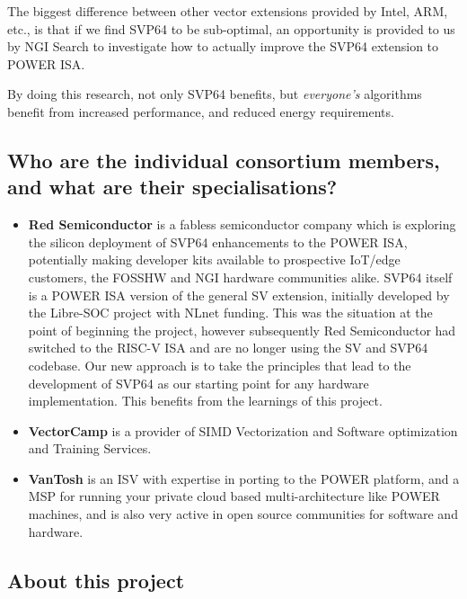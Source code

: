 The biggest difference between other vector extensions provided by Intel,
ARM, etc., is that if we find \acrshort{SVP64} to be sub-optimal, an opportunity is
provided to us by \acrshort{NGI} Search to investigate how to actually improve the
\acrshort{SVP64} extension to \acrshort{POWER} ISA.

By doing this research, not only \acrshort{SVP64} benefits, but \textit{everyone's} algorithms
benefit from increased performance, and reduced energy requirements.

\subsection{Who are the individual consortium members, and what are their specialisations?}

\begin{itemize}
  \item \textbf{Red Semiconductor} is a fabless semiconductor company which is
  exploring the silicon deployment of  \acrshort{SVP64} enhancements to the
  \acrshort{POWER} \acrshort{ISA}, potentially making developer kits available
  to prospective \acrfull{IoT}/edge customers, the \acrfull{FOSSHW} and
  \acrshort{NGI} hardware communities alike. \acrshort{SVP64} itself is a
  \acrshort{POWER} ISA version of the general \acrfull{SV} extension, initially
  developed by the Libre-SOC project with NLnet funding. This was the situation
  at the point of beginning the project, however subsequently Red Semiconductor
  had switched to the RISC-V \acrshort{ISA} and are no longer using the
  \acrshort{SV} and \acrshort{SVP64} codebase.
  Our new approach is to take the principles that lead to the development of
  \acrshort{SVP64} as our starting point for any hardware implementation.
  This benefits from the learnings of this project.
  \item \textbf{VectorCamp} is a provider of \acrfull{SIMD} Vectorization and Software optimization
  and Training Services.
  \item \textbf{VanTosh} is an \acrfull{ISV} with expertise in porting
  to the \acrshort{POWER} platform, and a \acrfull{MSP} for running
  your private cloud based multi-architecture like \acrshort{POWER} machines, and is
  also very active in open source communities for software and hardware.
\end{itemize}

\subsection{About this project}

